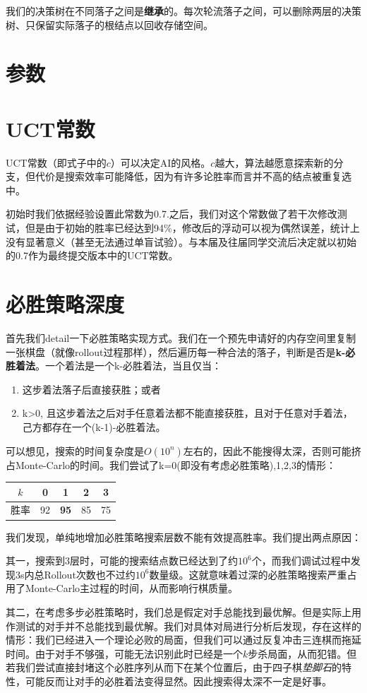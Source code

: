 \documentclass{article}
\begin{document}
	我们的决策树在不同落子之间是\textbf{继承}的。每次轮流落子之间，可以删除两层的决策树、只保留实际落子的根结点以回收存储空间。
	
	\section{参数}
	
	\section{UCT常数}
	
	UCT常数（即式子中的$c$）可以决定AI的风格。$c$越大，算法越愿意探索新的分支，但代价是搜索效率可能降低，因为有许多论胜率而言并不高的结点被重复选中。
	
	初始时我们依据经验设置此常数为0.7.之后，我们对这个常数做了若干次修改测试，但是由于初始的胜率已经达到94\%，修改后的浮动可以视为偶然误差，统计上没有显著意义（甚至无法通过单盲试验）。与本届及往届同学交流后决定就以初始的0.7作为最终提交版本中的UCT常数。
	
	\section{必胜策略深度}
	
	首先我们detail一下必胜策略实现方式。我们在一个预先申请好的内存空间里复制一张棋盘（就像rollout过程那样），然后遍历每一种合法的落子，判断是否是\textbf{k-必胜着法}。一个着法是一个k-必胜着法，当且仅当：
	
	\begin{enumerate}
		\item 这步着法落子后直接获胜；或者
		\item k>0, 且这步着法之后对手任意着法都不能直接获胜，且对于任意对手着法，己方都存在一个(k-1)-必胜着法。
	\end{enumerate}
	
	可以想见，搜索的时间复杂度是$O(10^n)$左右的，因此不能搜得太深，否则可能挤占Monte-Carlo的时间。我们尝试了k=0(即没有考虑必胜策略),1,2,3的情形：
	
	\begin{table}[h]
		\centering
		\begin{tabular}{||c|c|c|c|c||}
			\hline $k$&0&1&2&3 \\
			\hline 胜率&92&\textbf{95}&85&75\\
			\hline
		\end{tabular}
	\end{table}

	我们发现，单纯地增加必胜策略搜索层数不能有效提高胜率。我们提出两点原因：
	
	其一，搜索到3层时，可能的搜索结点数已经达到了约$10^6$个，而我们调试过程中发现3s内总Rollout次数也不过约$10^6$数量级。这就意味着过深的必胜策略搜索严重占用了Monte-Carlo主过程的时间，从而影响行棋质量。
	
	其二，在考虑多步必胜策略时，我们总是假定对手总能找到最优解。但是实际上用作测试的对手并不总能找到最优解。我们对具体对局进行分析后发现，存在这样的情形：我们已经进入一个理论必败的局面，但我们可以通过反复冲击三连棋而拖延时间。由于对手不够强，可能无法识别此时已经是一个$k$步杀局面，从而犯错。但若我们尝试直接封堵这个必胜序列从而下在某个位置后，由于四子棋\textit{垫脚石}的特性，可能反而让对手的必胜着法变得显然。因此搜索得太深不一定是好事。
\end{document}
